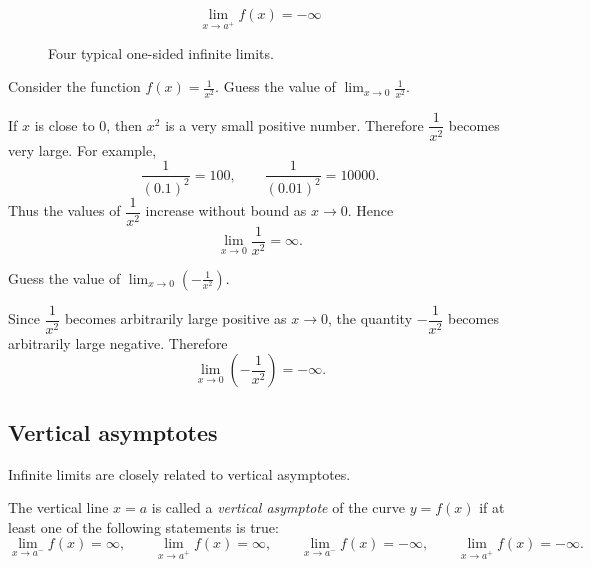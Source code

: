 \begin{figure}[tbp]
\begin{minipage}{0.23\textwidth}

\vspace{0.3em}
\[
\lim_{x\to a^+}f(x)=-\infty
\]
\end{minipage}

\caption{Four typical one-sided infinite limits.}
\label{fig:one-sided-infinite-limits}
\end{figure}

\begin{example}
Consider the function
\(\displaystyle
f(x)=\frac{1}{x^2}.
\)
Guess the value of
\(\displaystyle
\lim_{x\to 0}\frac{1}{x^2}.
\)
\end{example}

\begin{solution}
If \(x\) is close to \(0\), then \(x^2\) is a very small positive number. Therefore \(\dfrac{1}{x^2}\) becomes very large. For example,
\[
\frac{1}{(0.1)^2}=100,
\qquad
\frac{1}{(0.01)^2}=10000.
\]
Thus the values of \(\dfrac{1}{x^2}\) increase without bound as \(x\to 0\). Hence
\[
\lim_{x\to 0}\frac{1}{x^2}=\infty.
\]
\end{solution}

\begin{example}
Guess the value of
\(\displaystyle
\lim_{x\to 0}\left(-\frac{1}{x^2}\right).
\)
\end{example}

\begin{solution}
Since \(\dfrac{1}{x^2}\) becomes arbitrarily large positive as \(x\to 0\), the quantity \(-\dfrac{1}{x^2}\) becomes arbitrarily large negative. Therefore
\[
\lim_{x\to 0}\left(-\frac{1}{x^2}\right)=-\infty.
\]
\end{solution}

\subsection{Vertical asymptotes}

Infinite limits are closely related to vertical asymptotes.

\begin{definition}
The vertical line \(x=a\) is called a \emph{vertical asymptote} of the curve \(y=f(x)\) if at least one of the following statements is true:
\[
\lim_{x\to a^-}f(x)=\infty,
\qquad
\lim_{x\to a^+}f(x)=\infty,
\qquad
\lim_{x\to a^-}f(x)=-\infty,
\qquad
\lim_{x\to a^+}f(x)=-\infty.
\]
\end{definition}

